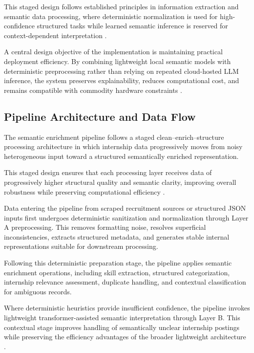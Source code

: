 This staged design follows established principles in information extraction and semantic data processing, where deterministic normalization is used for high-confidence structured tasks while learned semantic inference is reserved for context-dependent interpretation \cite{sarawagi2008information, grishman2015information, chu2016data}.

A central design objective of the implementation is maintaining practical deployment efficiency. By combining lightweight local semantic models with deterministic preprocessing rather than relying on repeated cloud-hosted LLM inference, the system preserves explainability, reduces computational cost, and remains compatible with commodity hardware constraints \cite{schwartz2020green, menghani2023efficient}.

\subsection{Pipeline Architecture and Data Flow}

The semantic enrichment pipeline follows a staged clean--enrich--structure processing architecture in which internship data progressively moves from noisy heterogeneous input toward a structured semantically enriched representation.

This staged design ensures that each processing layer receives data of progressively higher structural quality and semantic clarity, improving overall robustness while preserving computational efficiency \cite{doan2012principles, sarawagi2008information}.

Data entering the pipeline from scraped recruitment sources or structured JSON inputs first undergoes deterministic sanitization and normalization through Layer A preprocessing. This removes formatting noise, resolves superficial inconsistencies, extracts structured metadata, and generates stable internal representations suitable for downstream processing.

Following this deterministic preparation stage, the pipeline applies semantic enrichment operations, including skill extraction, structured categorization, internship relevance assessment, duplicate handling, and contextual classification for ambiguous records.

Where deterministic heuristics provide insufficient confidence, the pipeline invokes lightweight transformer-assisted semantic interpretation through Layer B. This contextual stage improves handling of semantically unclear internship postings while preserving the efficiency advantages of the broader lightweight architecture \cite{reimers2019sentence, schwartz2020green}.

